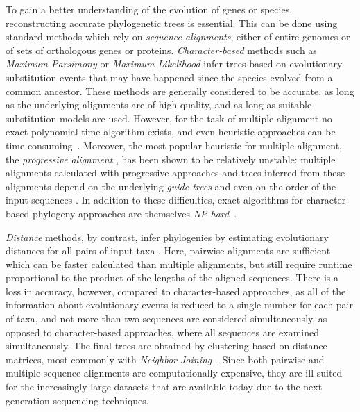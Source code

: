 \documentclass[review]{elsarticle}
\begin{document}
To gain a better understanding of the evolution of genes or species, reconstructing accurate phylogenetic trees is essential. This can be done using standard methods which rely on  \textit{sequence alignments}, either of entire genomes or of sets of orthologous genes or proteins.    
\textit{Character-based} methods such as {\em Maximum Parsimony} \cite{far:70,fit:71} or {\em Maximum Likelihood} \cite{fel:81} infer trees based on evolutionary substitution events that 
may have happened since the species evolved from a common ancestor. 
These methods are generally considered to be  accurate, 
as long as the underlying alignments are of high quality, {and as long
as suitable substitution models are used}. However,
for the task of multiple alignment no exact polynomial-time algorithm 
exists, and even heuristic approaches can be time consuming~\cite{sie:wil:din:etal:11}. 
Moreover, 
the most popular heuristic for multiple alignment, the {\em progressive
alignment} \cite{fen:doo:87}, has been shown to be relatively unstable: 
multiple alignments calculated with  
progressive approaches and trees inferred from these alignments  
depend on the underlying {\em guide trees} and even on the
order of the input sequences \cite{cha:flo:tom:etal:18}.
In addition to these difficulties, 
exact algorithms for {character-based} phylogeny approaches  
are themselves 
{\em NP hard}~\cite{cho:tul:05,AAM:FouldsG1982}.

{\em Distance} methods, by contrast, {infer phylogenies by estimating}  evolutionary distances for all pairs of input taxa \cite{fel:84}. Here,  
 pairwise alignments are sufficient which can be faster calculated than multiple alignments, but still require runtime proportional to the product of the lengths of the aligned sequences. There is a loss in accuracy, however, compared to character-based approaches, as all of the information about evolutionary events is reduced to a single number for each pair of taxa, 
and not more than two sequences are considered simultaneously, as opposed to character-based approaches, where all sequences are examined simultaneously. 
%
%
The final trees 
%
 are obtained by clustering based on distance matrices, most commonly with \textit{Neighbor Joining}~\cite{sai:nei:87}.
Since both pairwise and multiple sequence alignments are computationally expensive, they are ill-suited for the increasingly large datasets that are available today due to the next generation sequencing techniques. 
\end{document}
